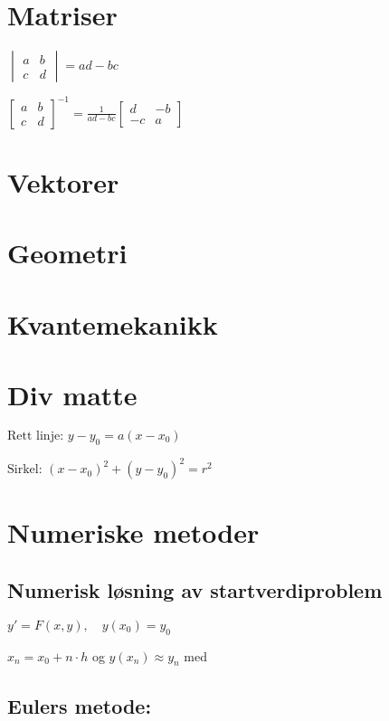 \documentclass[a4paper,7pt,fleqn]{article}
\begin{document}
\newpage
\section{Matriser}
\(  
\begin{vmatrix}  
a & b \\  
c & d  
\end{vmatrix} = ad - bc  
\)  

\(
\begin{bmatrix}  
a & b \\  
c & d  
\end{bmatrix}^{-1} =  
\frac{1}{ad - bc}  
\begin{bmatrix}  
d & -b \\  
-c & a  
\end{bmatrix}  
\)  


\newpage
\section{Vektorer}

\newpage
\section{Geometri}

\newpage
\section{Kvantemekanikk}

\newpage
\section{Div matte}
\(\text{Rett linje: } y - y_0 = a(x - x_0)\)  

\(\text{Sirkel: } (x - x_0)^2 + (y - y_0)^2 = r^2\) 

\newpage
\section{Numeriske metoder}
\subsection{Numerisk løsning av startverdiproblem}  

\( y' = F(x,y), \quad y(x_0) = y_0 \)  

\( x_n = x_0 + n \cdot h \) og \( y(x_n) \approx y_n \) med  

\subsection{Eulers metode:}  
\end{document}
